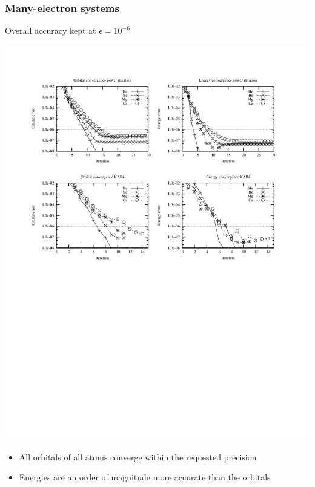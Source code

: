 \documentclass[mathserif, 10pt]{beamer}
\begin{document}
\begin{frame}
    \frametitle{Many-electron systems}
    \centering
    Overall accuracy kept at $\epsilon = 10^{-6}$
    \begin{center}
	\includegraphics[scale=0.7, clip, viewport = 50 550 550 740]{figures/accuracy.pdf}
    \end{center}

    \vspace{5mm}

    \begin{itemize}
        \item All orbitals of all atoms converge within the requested precision
        \item Energies are an order of magnitude more accurate than the orbitals
    \end{itemize}
\end{frame}
\end{document}
